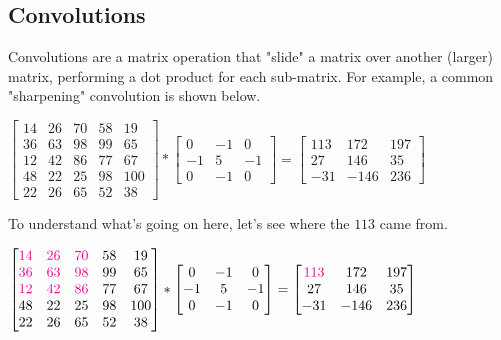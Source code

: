 \documentclass{article}
\begin{document}
\subsection{Convolutions}
Convolutions are a matrix operation that "slide" a matrix over another (larger) matrix, performing a dot product for each sub-matrix. For example, a common "sharpening" convolution is shown below.
\begin{center}
    $\begin{bmatrix}
        14 & 26 & 70 & 58 & 19 \\
        36 & 63 & 98 & 99 & 65 \\
        12 & 42 & 86 & 77 & 67 \\
        48 & 22 & 25 & 98 & 100 \\
        22 & 26 & 65 & 52 & 38
    \end{bmatrix}\ast\begin{bmatrix}
        0 & -1 & 0 \\
        -1 & 5 & -1 \\
        0 & -1 & 0
    \end{bmatrix}=\begin{bmatrix}
        113 & 172 & 197 \\
        27 & 146 & 35 \\
        -31 & -146 & 236
    \end{bmatrix}$
\end{center}
To understand what's going on here, let's see where the $113$ came from. 
\begin{center}
    $\begin{bmatrix}
        \color{magenta}14 & \color{magenta}26 & \color{magenta}70 & 58 & 19 \\
        \color{magenta}36 & \color{magenta}63 & \color{magenta}98 & 99 & 65 \\
        \color{magenta}12 & \color{magenta}42 & \color{magenta}86 & 77 & 67 \\
        48 & 22 & 25 & 98 & 100 \\
        22 & 26 & 65 & 52 & 38
    \end{bmatrix}\ast\begin{bmatrix}
        0 & -1 & 0 \\
        -1 & 5 & -1 \\
        0 & -1 & 0
    \end{bmatrix}=\begin{bmatrix}
        \color{magenta}113 & 172 & 197 \\
        27 & 146 & 35 \\
        -31 & -146 & 236
    \end{bmatrix}$
\end{center}
\end{document}
